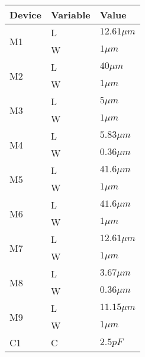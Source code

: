 \begin{table}[h]
	\begin{tabular}{| l | l | l |}
		\hline
		Device			& Variable	& Value		\\
		\hline
		\multirow{2}{*}{M1}	& L		& $12.61\mu m$	\\
					& W		& $1\mu m$	\\
		\hline
		\multirow{2}{*}{M2}	& L		& $40\mu m$	\\
					& W		& $1\mu m$	\\
		\hline
		\multirow{2}{*}{M3}	& L		& $5\mu m$	\\
					& W		& $1\mu m$	\\
		\hline
		\multirow{2}{*}{M4}	& L		& $5.83\mu m$	\\
					& W		& $0.36\mu m$	\\
		\hline
		\multirow{2}{*}{M5}	& L		& $41.6\mu m$	\\
					& W		& $1\mu m$	\\
		\hline
		\multirow{2}{*}{M6}	& L		& $41.6\mu m$	\\
					& W		& $1\mu m$	\\
		\hline
		\multirow{2}{*}{M7}	& L		& $12.61\mu m$	\\
					& W		& $1\mu m$	\\
		\hline
		\multirow{2}{*}{M8}	& L		& $3.67\mu m$	\\
					& W		& $0.36\mu m$	\\
		\hline
		\multirow{2}{*}{M9}	& L		& $11.15\mu m$	\\
					& W		& $1\mu m$	\\
		\hline
		\multirow{1}{*}{C1}	& C		& $2.5pF$	\\
		\hline
	\end{tabular}
\end{table}
